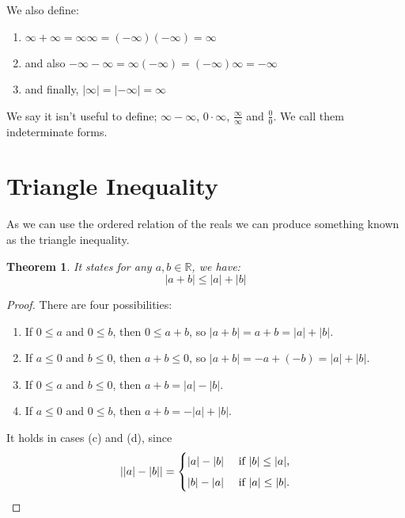 \documentclass{article}
\newcommand{\R}{\mathbb{R}}
\newtheorem{theorem}{Theorem}
\begin{document}
We also define:
\begin{enumerate}
  \item $\infty + \infty = \infty\infty = (-\infty)(-\infty) = \infty$\\
  \item and also $- \infty - \infty = \infty(-\infty) = (-\infty)\infty = -\infty$\\
  \item and finally, $|\infty| = |-\infty| = \infty$
\end{enumerate}

We say it isn't useful to define; $\infty - \infty$, $0 \cdot \infty$, $\displaystyle{\frac{\infty}{\infty}}$ and $\displaystyle{\frac{0}{0}}$. We call them indeterminate forms.

\section{Triangle Inequality}
As we can use the ordered relation of the reals we can produce something known as the {\color{blue} triangle inequality}.
\begin{theorem}
  It states for any $a, b \in \R$, we have:
  $$ |a + b| \le |a| + |b|$$
\end{theorem}
\begin{proof}
  There are four possibilities:
  \begin{enumerate}
    \item If $0 \le a$ and $0 \le b$, then $0 \le a + b$, so $|a + b| = a + b = |a| + |b|$.
    \item If $a \le 0$ and $b \le 0$, then $a + b \le 0$, so $|a + b| = -a + (-b) = |a| + |b|$.
    \item If $0 \le a$ and $b \le 0$, then $a + b = |a| - |b|$.
    \item If $a \le 0$ and $0 \le b$, then $a + b = -|a| + |b|$.
  \end{enumerate}

It holds in cases (c) and (d), since
$$ ||a| - |b|| = \begin{cases}
|a| - |b| & \text{ if } |b| \le |a|,\vspace{5px}\\
|b| - |a| & \text{ if } |a| \le |b|.\\
\end{cases}
 $$
\end{proof}
\end{document}
